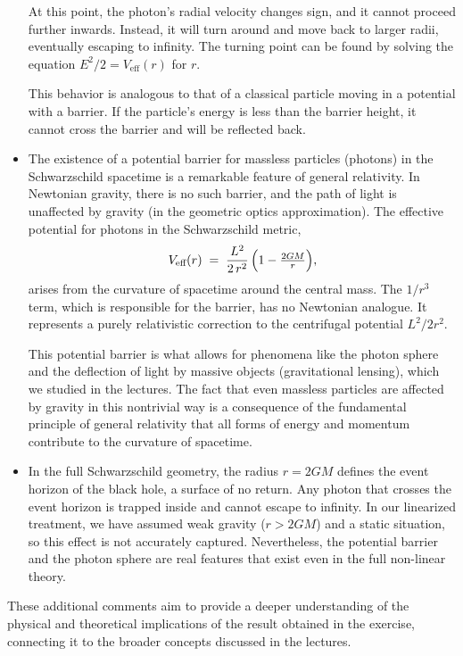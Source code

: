 \begin{itemize}
    At this point, the photon's radial velocity changes sign, and it cannot proceed further inwards. Instead, it will turn around and move back to larger radii, eventually escaping to infinity. The turning point can be found by solving the equation $E^2/2 = V_{\text{eff}}(r)$ for $r$.

    This behavior is analogous to that of a classical particle moving in a potential with a barrier. If the particle's energy is less than the barrier height, it cannot cross the barrier and will be reflected back.

    \item The existence of a potential barrier for massless particles (photons) in the Schwarzschild spacetime is a remarkable feature of general relativity. In Newtonian gravity, there is no such barrier, and the path of light is unaffected by gravity (in the geometric optics approximation). The effective potential for photons in the Schwarzschild metric,
    \[
    V_{\text{eff}}(r)
    \;=\;
    \frac{L^2}{2\,r^2}\,\Bigl(1-\tfrac{2GM}{r}\Bigr),
    \]
    arises from the curvature of spacetime around the central mass. The $1/r^3$ term, which is responsible for the barrier, has no Newtonian analogue. It represents a purely relativistic correction to the centrifugal potential $L^2/2r^2$.

    This potential barrier is what allows for phenomena like the photon sphere and the deflection of light by massive objects (gravitational lensing), which we studied in the lectures. The fact that even massless particles are affected by gravity in this nontrivial way is a consequence of the fundamental principle of general relativity that all forms of energy and momentum contribute to the curvature of spacetime.

    \item In the full Schwarzschild geometry, the radius $r=2GM$ defines the event horizon of the black hole, a surface of no return. Any photon that crosses the event horizon is trapped inside and cannot escape to infinity. In our linearized treatment, we have assumed weak gravity ($r>2GM$) and a static situation, so this effect is not accurately captured. Nevertheless, the potential barrier and the photon sphere are real features that exist even in the full non-linear theory.

\end{itemize}

These additional comments aim to provide a deeper understanding of the physical and theoretical implications of the result obtained in the exercise, connecting it to the broader concepts discussed in the lectures.


